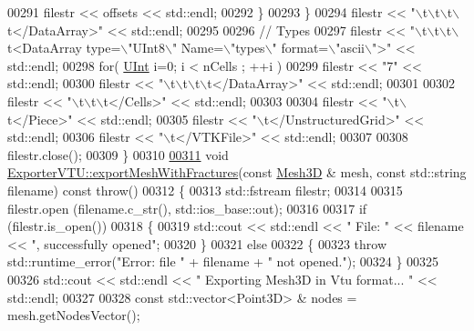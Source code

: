 \begin{DoxyCode}
00291             filestr << offsets << std::endl;
00292         \}
00293     \}
00294     filestr << \textcolor{stringliteral}{"\(\backslash\)t\(\backslash\)t\(\backslash\)t\(\backslash\)t</DataArray>"} << std::endl;
00295 
00296     \textcolor{comment}{//  Types}
00297     filestr << \textcolor{stringliteral}{"\(\backslash\)t\(\backslash\)t\(\backslash\)t\(\backslash\)t<DataArray type=\(\backslash\)"UInt8\(\backslash\)" Name=\(\backslash\)"types\(\backslash\)" format=\(\backslash\)"ascii\(\backslash\)">"} << std::endl;
00298     \textcolor{keywordflow}{for}( \hyperlink{namespaceFVCode3D_a4bf7e328c75d0fd504050d040ebe9eda}{UInt} i=0; i < nCells ; ++i )
00299         filestr << \textcolor{stringliteral}{"7"} << std::endl;
00300     filestr << \textcolor{stringliteral}{"\(\backslash\)t\(\backslash\)t\(\backslash\)t\(\backslash\)t</DataArray>"} << std::endl;
00301 
00302     filestr << \textcolor{stringliteral}{"\(\backslash\)t\(\backslash\)t\(\backslash\)t</Cells>"} << std::endl;
00303 
00304     filestr << \textcolor{stringliteral}{"\(\backslash\)t\(\backslash\)t</Piece>"} << std::endl;
00305     filestr << \textcolor{stringliteral}{"\(\backslash\)t</UnstructuredGrid>"} << std::endl;
00306     filestr << \textcolor{stringliteral}{"\(\backslash\)t</VTKFile>"} << std::endl;
00307 
00308     filestr.close();
00309 \}
00310 
\hypertarget{ExportVTU_8cpp_source.tex_l00311}{}\hyperlink{classFVCode3D_1_1ExporterVTU_a5af587a4d971f4d41caecbef3477211b}{00311} \textcolor{keywordtype}{void} \hyperlink{classFVCode3D_1_1ExporterVTU_a5af587a4d971f4d41caecbef3477211b}{ExporterVTU::exportMeshWithFractures}(\textcolor{keyword}{const} 
      \hyperlink{classFVCode3D_1_1Mesh3D}{Mesh3D} & mesh, \textcolor{keyword}{const} std::string filename) \textcolor{keyword}{const} \textcolor{keywordflow}{throw}()
00312 \{
00313     std::fstream filestr;
00314 
00315     filestr.open (filename.c\_str(), std::ios\_base::out);
00316 
00317     \textcolor{keywordflow}{if} (filestr.is\_open())
00318     \{
00319         std::cout << std::endl << \textcolor{stringliteral}{" File: "} << filename << \textcolor{stringliteral}{", successfully opened"};
00320     \}
00321     \textcolor{keywordflow}{else}
00322     \{
00323         \textcolor{keywordflow}{throw} std::runtime\_error(\textcolor{stringliteral}{"Error: file "} + filename + \textcolor{stringliteral}{" not opened."});
00324     \}
00325 
00326     std::cout << std::endl << \textcolor{stringliteral}{" Exporting Mesh3D in Vtu format... "} << std::endl;
00327 
00328     \textcolor{keyword}{const} std::vector<Point3D> & nodes = mesh.getNodesVector();

\end{DoxyCode}
